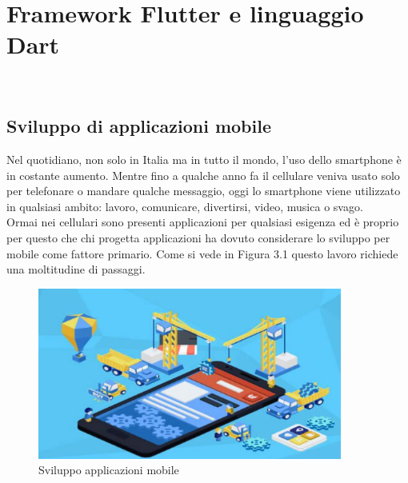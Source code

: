 
\chapter{Framework Flutter e linguaggio Dart}
\label{cap:Framework Flutter e linguaggio Dart}

\\

\section{Sviluppo di applicazioni mobile}
Nel quotidiano, non solo in Italia ma in tutto il mondo, l'uso dello smartphone \cite{statistiche} è in costante aumento.
Mentre fino a qualche anno fa il cellulare veniva usato solo per telefonare o mandare qualche messaggio, oggi lo smartphone viene utilizzato in qualsiasi ambito: lavoro, comunicare, divertirsi, video, musica o svago. \\
Ormai nei cellulari sono presenti applicazioni per qualsiasi esigenza ed è proprio per questo che chi progetta applicazioni ha dovuto considerare lo sviluppo per mobile come fattore primario. Come si vede in Figura 3.1 questo lavoro richiede una moltitudine di passaggi.\\
	\begin{figure}[htbp]	
	\centering
	\includegraphics[width=10cm]{immagini/sviluppoapp.png}
	\caption{Sviluppo applicazioni mobile}
	\label{fig:Sviluppo applicazioni mobile}
\end{figure}

